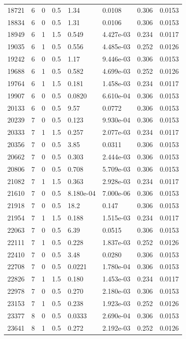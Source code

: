 \documentclass[preview]{standalone}
\begin{document}
{{{\begin{tabular}{L{1.2cm}C{1.2cm} C{0.3cm}C{0.5cm} C{1.4cm}C{1.4cm} C{1.4cm}C{1.4cm}}
  18721  &     6  & 0     & 0.5 &  1.34  & 0.0108  & 0.306 &  0.0153   \\ 
  18834  &     6  & 0     & 0.5 &  1.31  & 0.0106  & 0.306 &  0.0153   \\ 
  18949  &     6  & 1     & 1.5 &  0.549  & 4.427e-03  & 0.234 &  0.0117   \\ 
  19035  &     6  & 1     & 0.5 &  0.556  & 4.485e-03  & 0.252 &  0.0126   \\ 
  19242  &     6  & 0     & 0.5 &  1.17  & 9.446e-03  & 0.306 &  0.0153   \\ 
  19688  &     6  & 1     & 0.5 &  0.582  & 4.699e-03  & 0.252 &  0.0126   \\ 
  19764  &     6  & 1     & 1.5 &  0.181  & 1.458e-03  & 0.234 &  0.0117   \\ 
  19907  &     6  & 0     & 0.5 &  0.0820  & 6.610e-04  & 0.306 &  0.0153   \\ 
  20133  &     6  & 0     & 0.5 &  9.57  & 0.0772  & 0.306 &  0.0153   \\ 
  20239  &     7  & 0     & 0.5 &  0.123  & 9.930e-04  & 0.306 &  0.0153   \\ 
  20333  &     7  & 1     & 1.5 &  0.257  & 2.077e-03  & 0.234 &  0.0117   \\ 
  20356  &     7  & 0     & 0.5 &  3.85  & 0.0311  & 0.306 &  0.0153   \\ 
  20662  &     7  & 0     & 0.5 &  0.303  & 2.444e-03  & 0.306 &  0.0153   \\ 
  20806  &     7  & 0     & 0.5 &  0.708  & 5.709e-03  & 0.306 &  0.0153   \\ 
  21082  &     7  & 1     & 1.5 &  0.363  & 2.928e-03  & 0.234 &  0.0117   \\ 
  21610  &     7  & 0     & 0.5 &  8.180e-04  & 7.000e-06  & 0.306 &  0.0153   \\ 
  21918  &     7  & 0     & 0.5 &  18.2  & 0.147  & 0.306 &  0.0153   \\ 
  21954  &     7  & 1     & 1.5 &  0.188  & 1.515e-03  & 0.234 &  0.0117   \\ 
  22063  &     7  & 0     & 0.5 &  6.39  & 0.0515  & 0.306 &  0.0153   \\ 
  22111  &     7  & 1     & 0.5 &  0.228  & 1.837e-03  & 0.252 &  0.0126   \\ 
  22410  &     7  & 0     & 0.5 &  3.48  & 0.0280  & 0.306 &  0.0153   \\ 
  22708  &     7  & 0     & 0.5 &  0.0221  & 1.780e-04  & 0.306 &  0.0153   \\ 
  22826  &     7  & 1     & 1.5 &  0.180  & 1.453e-03  & 0.234 &  0.0117   \\ 
  22978  &     7  & 0     & 0.5 &  0.270  & 2.180e-03  & 0.306 &  0.0153   \\ 
  23153  &     7  & 1     & 0.5 &  0.238  & 1.923e-03  & 0.252 &  0.0126   \\ 
  23377  &     8  & 0     & 0.5 &  0.0333  & 2.690e-04  & 0.306 &  0.0153   \\ 
  23641  &     8  & 1     & 0.5 &  0.272  & 2.192e-03  & 0.252 &  0.0126   \\ 
\hline 
\end{tabular} 

}}}
\end{document}
